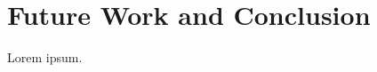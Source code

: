 \documentclass[runningheads,a4paper]{llncs}
\begin{document}
\section{Future Work and Conclusion} \label{sec:future-work-conclusion}
Lorem ipsum.

\renewcommand{\ttdefault}{cmvtt}
\renewcommand\UrlFont\tt



\end{document}

